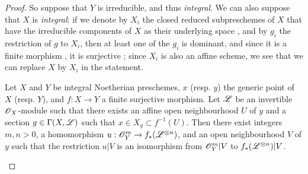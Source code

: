 \begin{proof}
So suppose that $Y$ is irreducible, and thus \emph{integral}.
We can also suppose that $X$ is \emph{integral}:
if we denote by $X_i$ the closed reduced subpreschemes of $X$ that have the irreducible components of $X$ as their underlying space , and by $g_i$ the restriction of $g$ to $X_i$, then at least one of the $g_i$ is dominant, and since it is a finite morphism , it is surjective ;
since $X_i$ is also an affine scheme, we see that we can replace $X$ by $X_i$ in the statement.

  \begin{lemma}[6.7.1.1]
  \label{II.6.7.1.1}
  Let $X$ and $Y$ be integral Noetherian preschemes, $x$ (resp. $y$) the generic point of $X$ (resp. $Y$), and $f:X\to Y$ a finite surjective morphism.
  Let $\mathscr{L}$ be an invertible $\mathscr{O}_X$-module such that there exists an affine open neighbourhood $U$ of $y$ and a section $g\in\Gamma(X,\mathscr{L})$ such that $x\in X_g\subset f^{-1}(U)$.
  Then there exist integers $m,n>0$, a homomorphism $u:\sh{O}_Y^m\to f_*(\sh{L}^{\otimes n})$, and an open neighbourhood $V$ of $y$ such that the restriction $u|V$ is an isomorphism from $\mathscr{O}_Y^m|V$ to $f_*(\mathscr{L}^{\otimes n})|V$.
  \end{lemma}


\end{proof}
